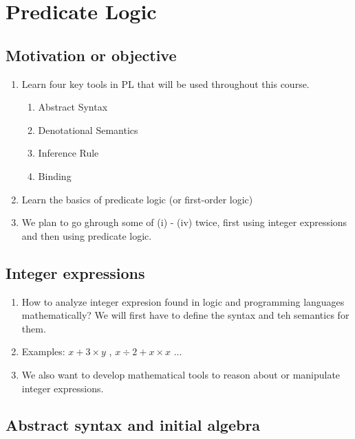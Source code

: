 
\chapter{Predicate Logic}

\section{Motivation or objective}

\begin{enumerate}[label=\protect\circled{\arabic*}]
  \item
    Learn four key tools in PL that will be used throughout this course.
    \begin{enumerate}[label=(\roman*)]
      \item Abstract Syntax
      \item Denotational Semantics
      \item Inference Rule
      \item Binding
    \end{enumerate}
  \item Learn the basics of predicate logic (or first-order logic)
  \item We plan to go ghrough some of (i) - (iv) twice, first using integer
    expressions and then using predicate logic.
\end{enumerate}

\section{Integer expressions}

\begin{enumerate}[label=\protect\circled{\arabic*}]
  \item
    How to analyze integer expresion found in logic and programming languages
    mathematically? We will first have to define the syntax and teh semantics
    for them.
  \item
    Examples: $x + 3 \times y$ , $x \div 2 + x \times x$ ...
  \item
    We also want to develop mathematical tools to reason about or manipulate
    integer expressions.
\end{enumerate}

\section{Abstract syntax and initial algebra}

